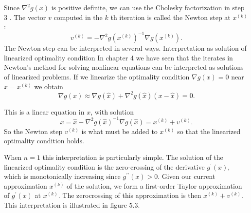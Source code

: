 Since $ \nabla^{2} g(x) $ is positive definite, we can use the Cholesky factorization in step 3 . The vector $ v $ computed in the $ k $ th iteration is called the Newton step at $ x^{(k)} $ :
$$
v^{(k)}=-\nabla^{2} g\left(x^{(k)}\right)^{-1} \nabla g\left(x^{(k)}\right) .
$$
The Newton step can be interpreted in several ways.
Interpretation as solution of linearized optimality condition In chapter 4 we have seen that the iterates in Newton's method for solving nonlinear equations can be interpreted as solutions of linearized problems.
If we linearize the optimality condition $ \nabla g(x)=0 $ near $ \hat{x}=x^{(k)} $ we obtain
$$
\nabla g(x) \approx \nabla g(\hat{x})+\nabla^{2} g(\hat{x})(x-\hat{x})=0 .
$$

This is a linear equation in $ x $, with solution
$$
x=\hat{x}-\nabla^{2} g(\hat{x})^{-1} \nabla g(\hat{x})=x^{(k)}+v^{(k)} .
$$
So the Newton step $ v^{(k)} $ is what must be added to $ x^{(k)} $ so that the linearized optimality condition holds.

When $ n=1 $ this interpretation is particularly simple. The solution of the linearized optimality condition is the zero-crossing of the derivative $ g^{\prime}(x) $, which is monotonically increasing since $ g^{\prime \prime}(x)>0 $. Given our current approximation $ x^{(k)} $ of the solution, we form a first-order Taylor approximation of $ g^{\prime}(x) $ at $ x^{(k)} . $ The zerocrossing of this approximation is then $ x^{(k)}+v^{(k)} $. This interpretation is illustrated in figure $ 5.3 $.
